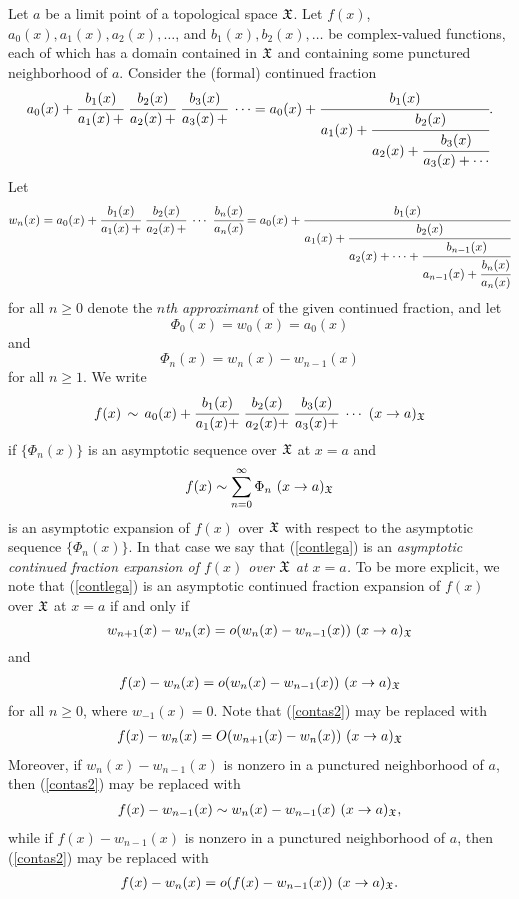 \documentclass[12pt]{article}
\begin{document}
Let $a$ be a limit point of a topological space ${\mathfrak X}$.  Let $f(x)$, $a_0(x), a_1(x), a_2(x), \ldots$, and $b_1(x), b_2(x), \ldots$ be complex-valued functions, each of which has a domain contained in ${\mathfrak X}$ and  containing some punctured neighborhood of $a$.   Consider the (formal) continued fraction
\begin{align*}
a_0(x) + \cfrac{b_1(x)}{a_1(x) \, +} \ \cfrac{b_2(x)}{a_2(x)\, +} \ \cfrac{b_3(x)}{a_3(x)\, +}  \ \cdots = a_0(x) +\cfrac{b_1(x)}{a_1(x)+\cfrac{b_2(x)}{a_2(x)+\cfrac{b_3(x)}{a_3(x)+\cdots}}}.
\end{align*}
Let 
\begin{align*}
w_n(x) =  a_0(x) + \cfrac{b_1(x)}{a_1(x)\, +} \ \cfrac{b_2(x)}{a_2(x)\, +} \ \cdots \ \cfrac{b_n(x)}{a_n(x)}  = a_0(x) +\cfrac{b_1(x)}{a_1(x)+\cfrac{b_2(x)}{a_2(x)+\cdots +\cfrac{b_{n-1}(x)}{a_{n-1}(x)+\cfrac{b_{n}(x)}{a_{n}(x)}}}}
\end{align*} for all $n \geq 0$ denote the {\it $n$th approximant} of the given continued fraction, and let $$\Phi_0(x) = w_0(x) = a_0(x)$$ and $$\Phi_n(x) = w_n(x)-w_{n-1}(x)$$ for all $n \geq 1$.  We write 
\begin{align}\label{contlega} 
f(x) \, \sim \, a_0(x) + \cfrac{b_1(x)}{a_1(x)+} \ \cfrac{b_2(x)}{a_2(x)+} \ \cfrac{b_3(x)}{a_3(x)+} \ \cdots  \ (x \to a)_\XX
\end{align}
if  $\{\Phi_n(x)\}$ is an asymptotic sequence over ${\mathfrak X}$ at $x = a$  and 
$$f(x) \sim \sum_{n = 0}^\infty \Phi_n  \ (x \to a)_\XX$$
is an  asymptotic expansion of $f(x)$ over ${\mathfrak X}$ with respect to the asymptotic sequence $\{\Phi_n(x)\}$.  In that case we say that  (\ref{contlega}) is an {\it asymptotic continued fraction expansion of $f(x)$ over ${\mathfrak X}$ at $x = a$.}    To be more explicit, we note that (\ref{contlega}) is an asymptotic continued fraction expansion of $f(x)$ over ${\mathfrak X}$ at $x = a$ if  and only if 
$$w_{n+1}(x)-w_{n}(x) = o(w_n(x)-w_{n-1}(x)) \ (x \to a)_{\mathfrak X}$$
and
\begin{align}\label{contas2}
f(x) - w_{n}(x) = o( w_{n}(x)-w_{n-1}(x)) \ (x \to a)_{\mathfrak X}
\end{align}
for all $n \geq 0$, where $w_{-1}(x) = 0$.   Note that  (\ref{contas2})  may be replaced with
\begin{align*}
f(x) - w_{n}(x)  = O( w_{n+1}(x)-w_{n}(x)) \ (x \to a)_{\mathfrak X}
\end{align*}
Moreover, if  $w_n(x)-w_{n-1}(x)$ is nonzero in a punctured neighborhood of $a$, then (\ref{contas2}) may be replaced with 
\begin{align*}
f(x) - w_{n-1}(x) \sim w_{n}(x)-w_{n-1}(x) \ (x \to a)_{\mathfrak X},
\end{align*}
while if  $f(x)-w_{n-1}(x)$ is nonzero in a punctured neighborhood of $a$, then (\ref{contas2}) may be replaced with 
\begin{align*}
f(x) - w_{n}(x) = o(f(x) - w_{n-1}(x)) \ (x \to a)_{\mathfrak X}.
\end{align*}
\end{document}
